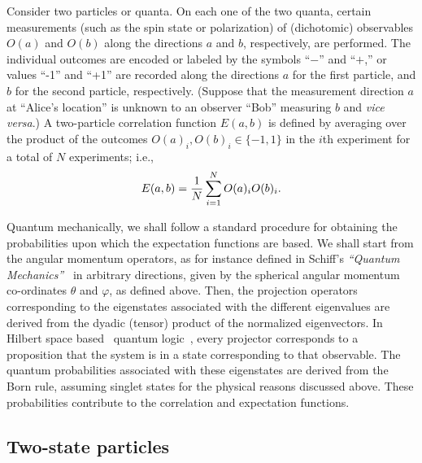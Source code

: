 \documentclass[pra,amsfonts,showpacs,showkeys,preprint]{revtex4}
\begin{document}
Consider two particles or quanta. On each one of the two quanta, certain measurements
(such as the spin state or polarization) of
(dichotomic) observables
$O({ a})$ and
$O({ b})$
along the directions $a$ and $b$, respectively, are performed.
The individual outcomes are
encoded or labeled by the symbols ``$-$'' and  ``$+$,'' or values ``-1'' and ``+1'' are recorded along
the directions ${ a}$ for the first particle, and  ${ b}$ for the second particle, respectively.
(Suppose that the measurement direction ${a}$ at ``Alice's location''
is unknown to an observer ``Bob'' measuring ${ b}$ and {\it vice versa}.)
A two-particle correlation function $E(a,b )$
is defined by averaging over the product of the outcomes $O({ a})_i, O({ b} )_i\in \{-1,1\}$
in the $i$th experiment for a total of $N$ experiments; i.e.,
\begin{equation}
E(a,b )={1\over N}\sum_{i=1}^N O({ a})_i O({ b})_i.
\end{equation}


Quantum mechanically, we shall follow a standard procedure for obtaining the probabilities upon which the expectation functions are based.
We shall start from the angular momentum operators, as for instance defined in Schiff's {\em ``Quantum Mechanics''}~\cite[Chap.~VI, Sec.24]{schiff-55}
in arbitrary directions, given by the spherical angular momentum co-ordinates $\theta$ and $\varphi$, as defined above.
Then, the projection operators corresponding to the eigenstates associated with the different eigenvalues are derived
from the dyadic (tensor) product of the normalized eigenvectors.
In Hilbert space based~\cite{v-neumann-49} quantum logic~\cite{birkhoff-36}, every projector corresponds to
a proposition that the system is in a state corresponding to that observable.
The quantum probabilities associated with these eigenstates are derived from the Born rule, assuming singlet states for the physical reasons discussed above.
These probabilities contribute to the correlation and expectation functions.

\subsection{Two-state particles}

\end{document}
